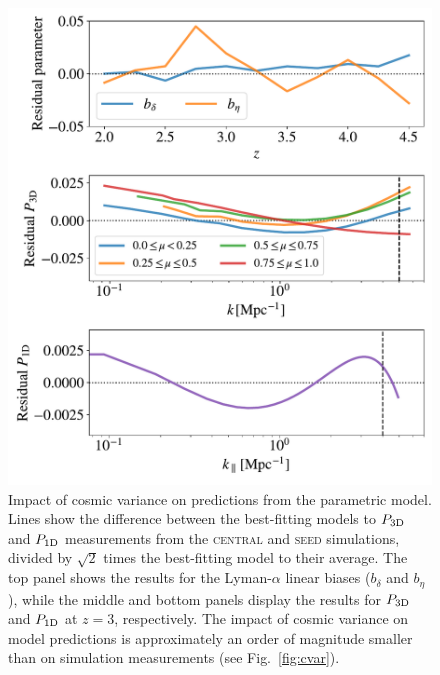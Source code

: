 \documentclass[longauth]{aa}
\newcommand{\lya}{Lyman-$\alpha$\xspace}
\newcommand{\poned}{\ensuremath{P_{\rm 1D}}\xspace}
\newcommand{\pthreed}{\ensuremath{P_{\rm 3D}}\xspace}
\newcommand{\simseed}{\textsc{seed}\xspace}
\newcommand{\simcentral}{\textsc{central}\xspace}
\begin{document}
\begin{appendix}
\begin{figure}
\includegraphics[width=\columnwidth]{figures/cvar_fit_z_3.0.pdf}
\centering
\caption{Impact of cosmic variance on predictions from the parametric model. Lines show the difference between the best-fitting models to \pthreed and \poned measurements from the \simcentral and \simseed simulations, divided by $\sqrt{2}$ times the best-fitting model to their average. The top panel shows the results for the \lya linear biases ($b_\delta$ and $b_\eta$), while the middle and bottom panels display the results for \pthreed and \poned at $z=3$, respectively. The impact of cosmic variance on model predictions is approximately an order of magnitude smaller than on simulation measurements (see Fig.~\ref{fig:cvar}).}
\label{fig:cvar_fit}
\end{figure}


\end{appendix}
\end{document}
